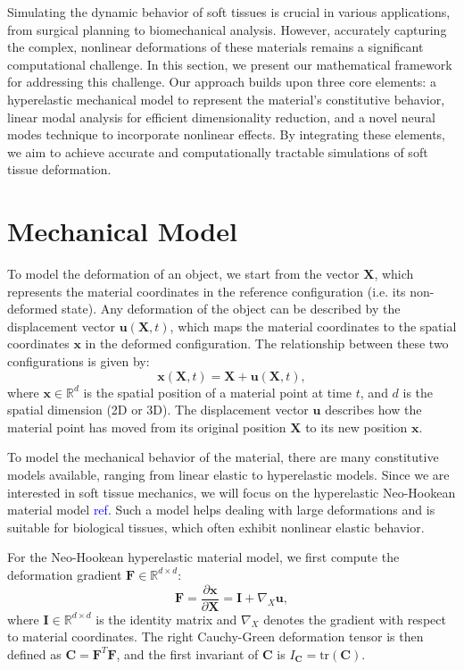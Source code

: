 \label{sec:problem_setting}

Simulating the dynamic behavior of soft tissues is crucial in various applications, from surgical planning to biomechanical analysis. However, accurately capturing the complex, nonlinear deformations of these materials remains a significant computational challenge. In this section, we present our mathematical framework for addressing this challenge. Our approach builds upon three core elements: a hyperelastic mechanical model to represent the material's constitutive behavior, linear modal analysis for efficient dimensionality reduction, and a novel neural modes technique to incorporate nonlinear effects. By integrating these elements, we aim to achieve accurate and computationally tractable simulations of soft tissue deformation.


\section{Mechanical Model}
\label{sec:mechanical_model}

To model the deformation of an object, we start from the vector \(\bm{X}\), which represents the material coordinates in the reference configuration (i.e. its non-deformed state). Any deformation of the object can be described by the displacement vector \(\bm{u}(\bm{X},t)\), which maps the material coordinates to the spatial coordinates \(\bm{x}\) in the deformed configuration. The relationship between these two configurations is given by:
\begin{equation}
    \bm{x}(\bm{X},t) = \bm{X} + \bm{u}(\bm{X},t),
\label{eq:deformation}
\end{equation}
where \(\bm{x} \in \mathbb{R}^d\) is the spatial position of a material point at time \(t\), and \(d\) is the spatial dimension (2D or 3D). The displacement vector \(\bm{u}\) describes how the material point has moved from its original position \(\bm{X}\) to its new position \(\bm{x}\).

To model the mechanical behavior of the material, there are many constitutive models available, ranging from linear elastic to hyperelastic models. Since we are interested in soft tissue mechanics, we will focus on the hyperelastic Neo-Hookean material model \textcolor{blue}{ref}. Such a model helps dealing with large deformations and is suitable for biological tissues, which often exhibit nonlinear elastic behavior.

For the Neo-Hookean hyperelastic material model, we first compute the deformation gradient $\bm{F} \in \mathbb{R}^{d\times d}$:
\begin{equation}
    \bm{F} = \frac{\partial \bm{x}}{\partial \bm{X}} = \bm{I} + \nabla_X \bm{u},
\label{eq:deformation_gradient}
\end{equation}
where $\bm{I} \in \mathbb{R}^{d\times d}$ is the identity matrix and $\nabla_X$ denotes the gradient with respect to material coordinates. The right Cauchy-Green deformation tensor is then defined as $\bm{C} = \bm{F}^T\bm{F}$, and the first invariant of $\bm{C}$ is $I_{\bm{C}} = \text{tr}(\bm{C})$.


